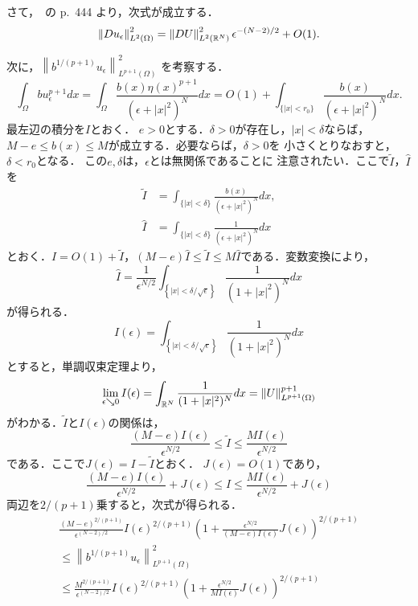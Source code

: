 さて，\cite{MR709644}~の p.~444 より，次式が成立する．
\begin{equation}
 \left\| Du_\epsilon \right\|_{L^2(\Omega)}^2 
  = \left\| DU \right\|_{L^2(\mathbb{R}^N)}^2 \epsilon^{-(N-2)/2} + O(1).
  \label{eq:Duepsilon}
\end{equation}

次に，$\left\| b^{1/(p+1)} u_\epsilon \right\|_{L^{p+1}(\Omega)}^2$
を考察する．
\[
 \int_\Omega b u_{\epsilon}^{p+1} dx
 = \int_\Omega \frac{b(x) \eta(x)^{p+1}}{(\epsilon + \lvert x
 \rvert^2)^N} dx 
 = O(1) + \int_{ \{ \lvert x \rvert < r_0 \} } 
 \frac{b(x)}{(\epsilon + \lvert x
 \rvert^2)^N} dx.
\]
最左辺の積分を$I$とおく．
$e > 0$とする．$\delta > 0$が存在し，$\lvert x \rvert < \delta$ならば，
$M - e \leq b(x) \leq M$が成立する．必要ならば，$\delta > 0$を
小さくとりなおすと，$\delta < r_0$となる．
この$e, \delta$は，$\epsilon$とは無関係であることに
注意されたい．ここで$\tilde{I}$，$\hat{I}$を
\begin{align*}
 \tilde{I} &= \int_{ \{ \lvert x \rvert < \delta \} } 
 \frac{b(x)}{(\epsilon + \lvert x
 \rvert^2)^N} dx, \\
 \hat{I} &= \int_{ \{ \lvert x \rvert < \delta \} } 
 \frac{1}{(\epsilon + \lvert x
 \rvert^2)^N} dx
\end{align*}
とおく．$I = O(1) + \tilde{I}$，$(M - e) \hat{I}
 \leq \tilde{I} \leq M \hat{I}$である．変数変換により，
\[
 \hat{I} 
 = \frac{1}{\epsilon^{N/2}} \int_{ \left\{ \lvert x \rvert <
 \delta/\sqrt{\epsilon} \right\}} \frac{1}{(1 + \lvert x
 \rvert^2)^N}dx
\]
が得られる．
\[
 I(\epsilon) = \int_{ \left\{ \lvert x \rvert <
 \delta/\sqrt{\epsilon} \right\}} \frac{1}{(1 + \lvert x
 \rvert^2)^N} dx
\]
とすると，単調収束定理より，
\[
 \lim_{\epsilon \searrow 0} I(\epsilon) =
 \int_{\mathbb{R}^N} \frac{1}{(1 + \lvert x
 \rvert^2)^N} dx = \left\| U \right\|_{L^{p+1}(\Omega)}^{p+1}
\]
がわかる．$\tilde{I}$と$I(\epsilon)$の関係は，
\[
 \frac{(M - e)I(\epsilon)}{\epsilon^{N/2}} \leq \tilde{I} \leq \frac{M
 I(\epsilon)}{\epsilon^{N/2}}
\]
である．ここで$J(\epsilon) = I - \tilde{I}$とおく．
$J(\epsilon) = O(1)$であり，
\[
 \frac{(M - e)I(\epsilon)}{\epsilon^{N/2}} + J(\epsilon)
 \leq I \leq \frac{M
 I(\epsilon)}{\epsilon^{N/2}} + J(\epsilon)
\]
両辺を$2/(p+1)$乗すると，次式が得られる．
\begin{multline}
 \frac{(M -e)^{2/(p+1)}}{\epsilon^{(N-2)/2}} I(\epsilon)^{2/(p+1)}
 \left( 1 + \frac{\epsilon^{N/2}}{(M-e)I(\epsilon)} J(\epsilon)
 \right)^{2/(p+1)}  \\  \leq  \left\| b^{1/(p+1)} u_\epsilon
 \right\|^2_{L^{p+1}(\Omega)}  \\ \leq
 \frac{M^{2/(p+1)}}{\epsilon^{(N-2)/2}} I(\epsilon)^{2/(p+1)}
 \left( 1 + \frac{\epsilon^{N/2}}{MI(\epsilon)} J(\epsilon)
 \right)^{2/(p+1)} \label{eq:2/p+1pow} 
\end{multline}
